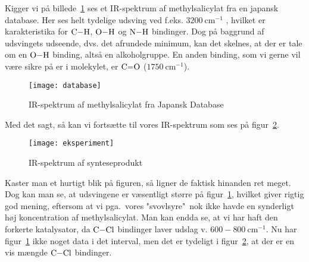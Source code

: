 \pagebreak

Kigger vi på billede~\ref{fig:database} ses et IR-spektrum
af methylsalicylat fra en japansk database. Her ses
helt tydelige udsving ved f.eks. $3200\ \unit{\centi\meter^{-1}}$
, hvilket er karakteristika for $\ce{C-H}$, $\ce{O-H}$ og 
$\ce{N-H}$ bindinger.
Dog på baggrund af udsvingets udseende, dvs. det afrundede minimum, kan det skelnes, at der er tale om en $\ce{O-H}$ binding,
altså en alkoholgruppe. En anden binding, som vi gerne vil 
være sikre på er i molekylet, er $\ce{C=O}$ ($1750\ \unit{\centi\meter^{-1}}$).

\begin{figure}[h!t]
	\centering
	\texttt{[image: database]}
	\caption[billede]{IR-spektrum af methylsalicylat fra Japansk Database}
	\label{fig:database}
\end{figure}

Med det sagt, så kan vi fortsætte til vores IR-spektrum som ses på figur~\ref{fig:eksperiment}.

\begin{figure}[h!t]
	\centering
	\texttt{[image: eksperiment]}
	\caption{IR-spektrum af synteseprodukt}
	\label{fig:eksperiment}
\end{figure}

Kaster man et hurtigt blik på figuren, så ligner de faktisk hinanden ret meget.
Dog kan man se, at udsvingene er væsentligt større på figur~\ref{fig:database},
hvilket giver rigtig god mening,
eftersom at vi pga.~vores "svovlsyre"\ nok ikke havde
en synderligt høj koncentration af methylsalicylat.
Man kan endda se, at vi har haft den forkerte katalysator, da 
$\ce{C-Cl}$ bindinger laver udslag v. $600-800\ \unit{\centi\meter^{-1}}$. Nu har figur~\ref{fig:database} ikke noget data i det interval,
men det er tydeligt i figur~\ref{fig:eksperiment},
at der er en vis mængde $\ce{C-Cl}$ bindinger.
